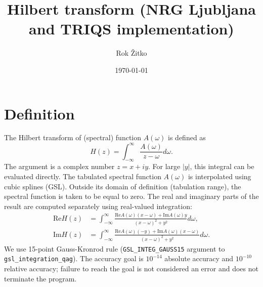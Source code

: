 \documentclass[prb,amsmath,amssymb,onecolumn,nopacs,floatfix]{revtex4}
\begin{document}
\title{Hilbert transform (NRG Ljubljana and TRIQS implementation)}

\author{Rok \v{Z}itko}

\date{\today}

\begin{abstract}
\end{abstract}

\maketitle

\newcommand{\vc}[1]{{\mathbf{#1}}}
\newcommand{\vck}{\vc{k}}
\newcommand{\braket}[2]{\langle#1|#2\rangle}
\newcommand{\expv}[1]{\langle #1 \rangle}
\newcommand{\corr}[1]{\langle\langle #1 \rangle\rangle}
\newcommand{\ket}[1]{| #1 \rangle}
\newcommand{\bra}[1]{\langle #1 |}
\newcommand{\Tr}{\mathrm{Tr}}
\newcommand{\kor}[1]{\langle\langle #1 \rangle\rangle}
\newcommand{\degg}{^\circ}
\renewcommand{\Im}{\mathrm{Im}}
\renewcommand{\Re}{\mathrm{Re}}
\newcommand{\dtN}{{\dot N}}
\newcommand{\dtQ}{{\dot Q}}
\newcommand{\sgn}{\mathrm{sgn}}
\newcommand{\beq}[1]{\begin{equation} #1 \end{equation}}
\newcommand{\one}{\mathbf{1}}

\section{Definition}

The Hilbert transform of (spectral) function $A(\omega)$ is defined as
%
\beq{
H(z) = \int_{-\infty}^{\infty} \frac{A(\omega)}{z-\omega} d\omega.
}
%
The argument is a complex number $z=x+i y$. For large $|y|$, this integral
can be evaluated directly. The tabulated spectral function $A(\omega)$ is
interpolated using cubic splines (GSL). Outside its domain of definition (tabulation
range), the spectral function is taken to be equal to zero.
The real and imaginary parts of the result 
are computed separately using real-valued integration:
%
\beq{
\begin{split}
\Re H(z) &= \int_{-\infty}^{\infty} \frac{\Re A(\omega) (x-\omega) + \Im A(\omega) y}
{(x-\omega)^2 + y^2} d\omega, \\
\Im H(z) &= \int_{-\infty}^{\infty} \frac{\Re A(\omega) (-y) + \Im A(\omega) (x-\omega)}
{(x-\omega)^2 + y^2} d\omega.
\end{split}
}
%
We use 15-point Gauss-Kronrod rule ({\tt GSL\_INTEG\_GAUSS15} argument to {\tt gsl\_integration\_qag}).
The accuracy goal is $10^{-14}$ absolute accuracy and $10^{-10}$ relative
accuracy; failure to reach the goal is not considered an error and does not
terminate the program.
\end{document}
